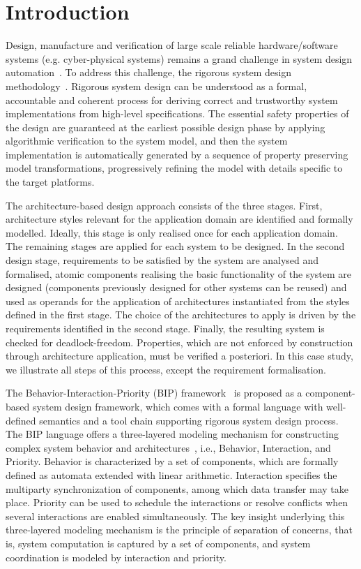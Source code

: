 
\section{Introduction}
\label{introduction}


Design, manufacture and verification of large scale reliable hardware/software systems (e.g. cyber-physical systems) 
remains a grand challenge in system design automation~\cite{sifakis2015}.
To address this challenge, the rigorous system design methodology~\cite{sifakis13}.
Rigorous system design can be understood as a formal, accountable and coherent process for deriving correct and trustworthy system implementations from high-level specifications.
The essential safety properties of the design are guaranteed at the earliest possible design phase by applying algorithmic verification to the system model,
 and then the system implementation is automatically generated by a sequence of property preserving model transformations, progressively refining the model with details specific to the target platforms.


The architecture-based design approach consists of the three stages.
First, architecture styles relevant for the application domain are identified and formally modelled. 
Ideally, this stage is only realised once for each application domain. The remaining stages are applied for each system to be designed. 
In the second design stage, requirements to be satisfied by the system are analysed and formalised,
atomic components realising the basic functionality of the system are designed
(components previously designed for other systems can be reused) and used as
operands for the application of architectures instantiated from the styles defined in the first stage. 
The choice of the architectures to apply is driven by the requirements identified in the second stage. 
Finally, the resulting system is checked for deadlock-freedom. 
Properties, which are not enforced by construction through architecture application, must be verified a posteriori. 
In this case study, we illustrate all steps of this process, except the requirement formalisation.


The Behavior-Interaction-Priority (BIP) framework~\cite{bip11} is proposed as a component-based system design framework, 
which comes with a formal language with well-defined semantics and a tool chain supporting rigorous system design process.
The BIP language offers a three-layered modeling mechanism for constructing complex system behavior and architectures~\cite{concur16}, i.e.,  Behavior, Interaction, and Priority.
%
Behavior is characterized by a set of components, which are formally defined as automata extended with linear arithmetic.
Interaction specifies the multiparty synchronization of components, among which data transfer may take place.
Priority can be used to schedule the interactions or resolve conflicts when several interactions are enabled simultaneously.
The key insight underlying this three-layered modeling mechanism is the principle of separation of concerns,
 that is, system computation is captured by a set of components, and system coordination is modeled by interaction and priority.



